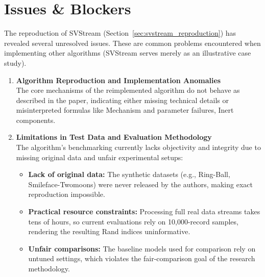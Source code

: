\section{Issues \& Blockers}
\label{sec:issues}

The reproduction of SVStream (Section~\ref{sec:svstream_reproduction}) has revealed several unresolved issues. These are common problems encountered when implementing other algorithms (SVStream serves merely as an illustrative case study).

\begin{enumerate}[label=\textbf{\arabic*.},leftmargin=2.2em,itemsep=8pt]
  \item \textbf{Algorithm Reproduction and Implementation Anomalies}\\
  The core mechanisms of the reimplemented algorithm do not behave as described in the paper, indicating either missing technical details or misinterpreted formulas like Mechanism and parameter failures, Inert components.
  

  \item \textbf{Limitations in Test Data and Evaluation Methodology}\\
  The algorithm's benchmarking currently lacks objectivity and integrity due to missing original data and unfair experimental setups:
  \begin{itemize}[leftmargin=1.4em,itemsep=2pt,topsep=2pt]
    \item \textbf{Lack of original data:} The synthetic datasets (e.g., Ring-Ball, Smileface-Twomoons) were never released by the authors, making exact reproduction impossible.
    \item \textbf{Practical resource constraints:} Processing full real data streams takes tens of hours, so current evaluations rely on 10,000-record samples, rendering the resulting Rand indices uninformative.
    \item \textbf{Unfair comparisons:} The baseline models used for comparison rely on untuned settings, which violates the fair-comparison goal of the research methodology.
  \end{itemize}
\end{enumerate}
